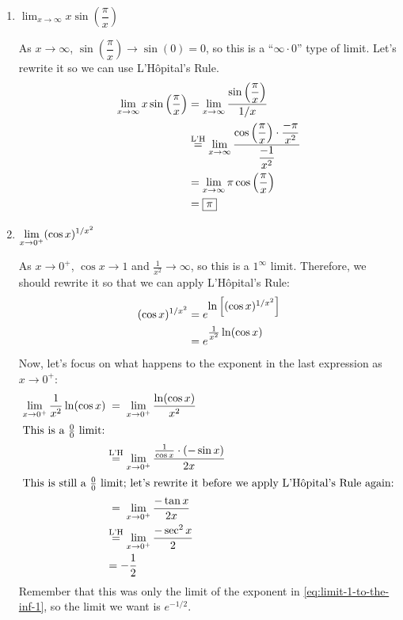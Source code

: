\documentclass{article}
\begin{document}
\begin{enumerate}
\begin{enumerate}
  \item $\displaystyle\lim_{x\to\infty} x\sin\left(\dfrac{\pi}{x}\right)$
  
  \begin{solution}
      As $x\to\infty$, $\sin\left(\dfrac{\pi}{x}\right) \to \sin(0)=0$, so this is a ``$\infty \cdot 0$'' type of limit. Let's rewrite it so we can use L'Hôpital's Rule.
      \begin{align*}
          \displaystyle\lim_{x\to\infty} x\sin\left(\dfrac{\pi}{x}\right) &=\displaystyle\lim_{x\to\infty} \dfrac{\sin\left(\dfrac{\pi}{x}\right)}{1/x}\\
          &\stackrel{\text{L'H}}{=} \displaystyle\lim_{x\to\infty} \dfrac{\cos\left(\dfrac{\pi}{x}\right)\cdot \dfrac{-\pi}{x^2}}{\dfrac{-1}{x^2}}\\
          &= \displaystyle\lim_{x\to\infty} \pi\cos\left(\dfrac{\pi}{x}\right)\\
          &=\boxed{\pi}
      \end{align*}
  \end{solution}
  \probonly{\vfill}


  \item $\displaystyle\lim_{x\to0^+} (\cos x)^{1/x^2}\vphantom{\frac{1}{1}}$

      \begin{solution} 
        As $x \to 0^+$, $\cos x \to 1$ and $\frac{1}{x^2} \to \infty$, so
        this is a $1^\infty$ limit.  Therefore, we should rewrite it so
        that we can apply L'Hôpital's Rule:
        \begin{align} 
          (\cos x)^{1/x^2} &= e^{\raisebox{3pt}{$\ln \left[ (\cos
                x)^{1/x^2} \right]$}} \nonumber \\
          &= e^{\raisebox{4pt}{$\frac{1}{x^2} \ln (\cos
              x)$}}
        \end{align}
        Now, let's focus on what happens to the exponent
        in the last expression as $x \to 0^+$:
        \begin{align*}
          \lim_{x \to 0^+} \frac{1}{x^2} \ln
          (\cos x) & \nolheq \lim_{x \to 0^+} \frac{\ln (\cos x)}{x^2} \\
          \shortintertext{This is a $\frac{0}{0}$ limit:}
          & \lheq \lim_{x \to 0^+} \frac{\frac{1}{\cos x} \cdot (-\sin
            x)}{2x} \\
          \intertext{This is still a $\frac{0}{0}$ limit; let's
            rewrite it before we apply L'Hôpital's Rule again:}
          & \nolheq \lim_{x \to 0^+} \frac{- \tan x}{2x} \\
          & \lheq \lim_{x \to 0^+} \frac{- \sec^2 x}{2} \\
          &= - \frac{1}{2}
        \end{align*}
        Remember that this was only the limit of the exponent in
        \eqref{eq:limit-1-to-the-inf-1}, so the limit we want is
        $\boxed{e^{-1/2}}$.
      \end{solution}
      \probonly{\vfill\vfill}
      

\end{enumerate}
\end{enumerate}
\end{document}
